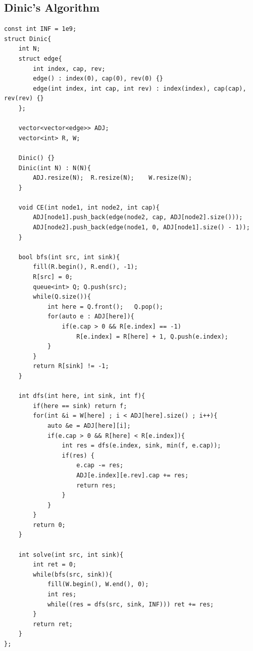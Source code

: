 \documentclass[landscape, 8pt, a4paper, oneside, twocolumn]{extarticle}
\begin{document}
\subsection {Dinic's Algorithm}
\begin{verbatim}
const int INF = 1e9;
struct Dinic{
    int N;
    struct edge{
        int index, cap, rev;
        edge() : index(0), cap(0), rev(0) {}
        edge(int index, int cap, int rev) : index(index), cap(cap), rev(rev) {}
    };

    vector<vector<edge>> ADJ;
    vector<int> R, W;

    Dinic() {}
    Dinic(int N) : N(N){
        ADJ.resize(N);  R.resize(N);    W.resize(N);
    }

    void CE(int node1, int node2, int cap){
        ADJ[node1].push_back(edge(node2, cap, ADJ[node2].size()));
        ADJ[node2].push_back(edge(node1, 0, ADJ[node1].size() - 1));
    }

    bool bfs(int src, int sink){
        fill(R.begin(), R.end(), -1);
        R[src] = 0;
        queue<int> Q; Q.push(src);
        while(Q.size()){
            int here = Q.front();   Q.pop();
            for(auto e : ADJ[here]){
                if(e.cap > 0 && R[e.index] == -1)
                    R[e.index] = R[here] + 1, Q.push(e.index);
            }
        }
        return R[sink] != -1;
    }

    int dfs(int here, int sink, int f){
        if(here == sink) return f;
        for(int &i = W[here] ; i < ADJ[here].size() ; i++){
            auto &e = ADJ[here][i];
            if(e.cap > 0 && R[here] < R[e.index]){
                int res = dfs(e.index, sink, min(f, e.cap));
                if(res) {
                    e.cap -= res;
                    ADJ[e.index][e.rev].cap += res;
                    return res; 
                }
            }
        }
        return 0;
    }

    int solve(int src, int sink){
        int ret = 0;
        while(bfs(src, sink)){
            fill(W.begin(), W.end(), 0);
            int res;
            while((res = dfs(src, sink, INF))) ret += res;
        }
        return ret;
    }
};
\end{verbatim}
\end{document}
